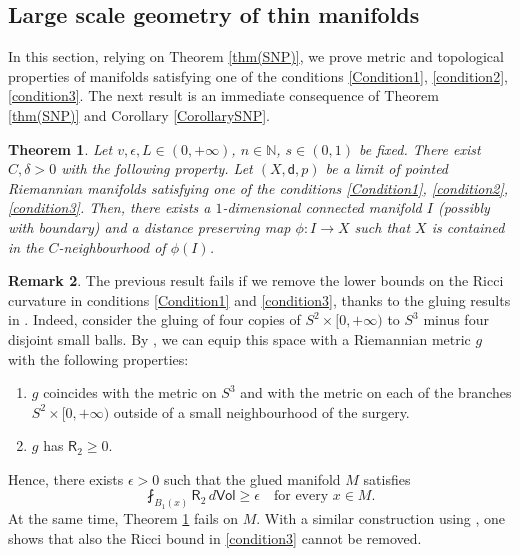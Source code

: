 \documentclass[10pt]{article}
\newtheorem{thm}{Theorem}[section]
\theoremstyle{definition}
\newtheorem{remark}[thm]{Remark}
\newcommand{\bb}[1]{\mathbb{#1}}
\newcommand{\ssf}[1]{\mathsf{#1}}
\newcommand{\sd}{\mathsf{d}}
\newcommand{\R}{\mathsf{R}}
\begin{document}
\subsection{Large scale geometry of thin manifolds}

In this section, relying on Theorem \ref{thm(SNP)}, we prove metric and topological properties of manifolds satisfying one of the conditions \eqref{Condition1}, \eqref{condition2}, \eqref{condition3}. The next result is an immediate consequence of Theorem \ref{thm(SNP)} and Corollary \ref{CorollarySNP}.

\begin{thm} \label{thmCentral}
Let $v,\epsilon,L \in (0,+\infty)$, $n \in \bb{N}$, $s \in (0,1)$ be fixed.
    There exist $C,\delta>0$ with the following property. Let $(X,\sd,p)$ be a limit of pointed Riemannian manifolds satisfying one of the conditions \eqref{Condition1}, \eqref{condition2}, \eqref{condition3}. Then, there exists a $1$-dimensional connected manifold $I$ (possibly with boundary) and a distance preserving map $\phi:I \to X$ such that $X$ is contained in the $C$-neighbourhood of $\phi(I)$.
    \end{thm}

    \begin{remark} \label{R6}
        The previous result fails if we remove the lower bounds on the Ricci curvature in conditions \eqref{Condition1} and \eqref{condition3}, thanks to the gluing results in \cite{GromovLawsonSurgery1, GromovLawsonSurgery2,WolfsonKricci}. Indeed, consider the gluing of four copies of $S^2 \times [0,+\infty)$ to $S^3$ minus four disjoint small balls. By \cite{WolfsonKricci}, we can equip this space with a Riemannian metric $g$ with the following properties:
        \begin{enumerate}
        \item $g$ coincides with the metric on $S^3$ and with the metric on each of the branches $S^2 \times [0,+\infty)$ outside of a small neighbourhood of the surgery.
        \item $g$ has $\R_2 \geq 0$.
        \end{enumerate}
        Hence, there exists $\epsilon>0$ such that the glued manifold $M$ satisfies
        \[
        \fint_{B_1(x)} \R_2 \, d\ssf{Vol} \geq \epsilon \quad \text{for every } x \in M.
        \]
        At the same time, Theorem \ref{thmCentral} fails on $M$. With a similar construction using \cite{GromovLawsonSurgery1, GromovLawsonSurgery2}, one shows that also the Ricci bound in \eqref{condition3} cannot be removed.
    \end{remark}
    
\end{document}

